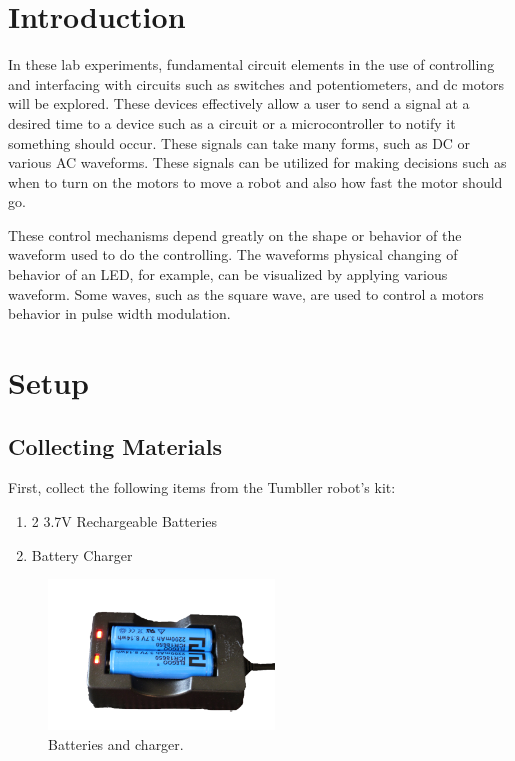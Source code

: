 \documentclass[12pt]{article}
\begin{document}
\MakeLabTop

\section{Introduction}

In these lab experiments, fundamental circuit elements in the use of controlling and interfacing with circuits such as switches and potentiometers, and dc motors will be explored. These devices effectively allow a user to send a signal at a desired time to a device such as a circuit or a microcontroller to notify it something should occur. These signals can take many forms, such as DC or various AC waveforms. These signals can be utilized for making decisions such as when to turn on the motors to move a robot and also how fast the motor should go. 

These control mechanisms depend greatly on the shape or behavior of the waveform used to do the controlling. The waveforms physical changing of behavior of an LED, for example, can be visualized by applying various waveform. Some waves, such as the square wave, are used to control a motors behavior in pulse width modulation. 

\section{Setup}

\subsection{Collecting Materials}

First, collect the following items from the Tumbller robot's kit:

\begin{enumerate}
    \item 2 3.7V Rechargeable Batteries
    \item Battery Charger
\end{enumerate}

\begin{figure}[H]
    \centering
    \includegraphics[width=6cm]{photos/lab/batteriescharger.png}
    \caption{Batteries and charger.}
\end{figure}
\end{document}
